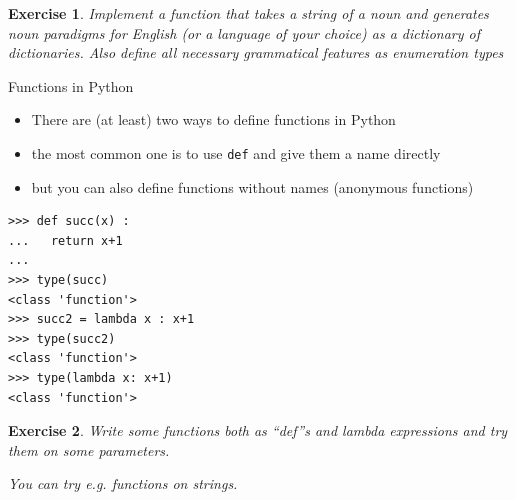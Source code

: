 \documentclass{beamer}
\newtheorem{exercise}{Exercise}
\begin{document}
\begin{frame}
  \begin{exercise}
Implement a function that takes a string of a noun and generates noun paradigms for English (or a language of your choice) as a dictionary of dictionaries. Also define all necessary grammatical features as enumeration types
\end{exercise}
\end{frame}
\begin{frame}[fragile]{Functions in Python}
  \begin{itemize}
  \item There are (at least) two ways to define functions in Python
  \item the most common one is to use \texttt{def} and give them a name directly
  \item but you can also define functions without names (anonymous functions)
  \end{itemize}
\begin{verbatim}
>>> def succ(x) :
...   return x+1
... 
>>> type(succ)
<class 'function'>
>>> succ2 = lambda x : x+1
>>> type(succ2)
<class 'function'>
>>> type(lambda x: x+1)
<class 'function'>
\end{verbatim}
\end{frame}

\begin{frame}
  \begin{exercise}
    Write some functions both as ``def''s and lambda expressions and try them on some parameters.

    You can try e.g. functions on strings.
  \end{exercise}
\end{frame}
\end{document}

